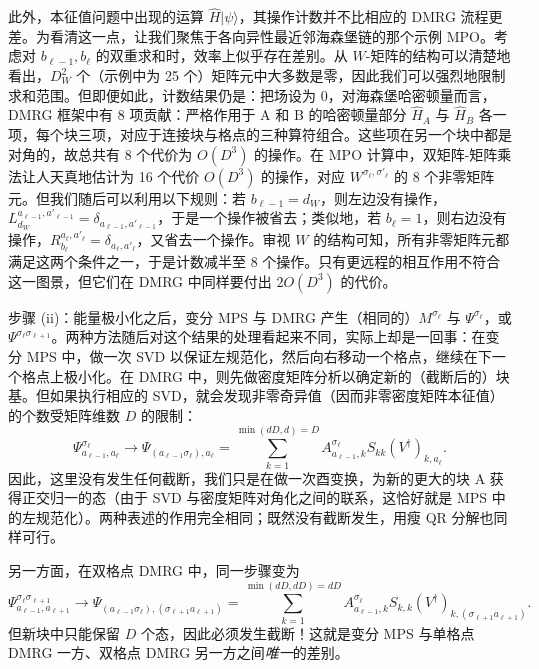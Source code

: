 \documentclass[a4paper,10pt,oneside,onecolumn,1p,times]{elsarticle}
\newcommand{\ket}[1]{\mbox{$| #1  \rangle$}}
\begin{document}
此外，本征值问题中出现的运算 $\hat{H}\ket{\psi}$，其操作计数并不比相应的 DMRG 流程更差。为看清这一点，让我们聚焦于各向异性最近邻海森堡链的那个示例 MPO。考虑对 $b_{\ell-1}, b_{\ell}$ 的双重求和时，效率上似乎存在差别。从 $W$-矩阵的结构可以清楚地看出，$D_W^2$ 个（示例中为 25 个）矩阵元中大多数是零，因此我们可以强烈地限制求和范围。但即便如此，计数结果仍是：把场设为 0，对海森堡哈密顿量而言，DMRG 框架中有 8 项贡献：严格作用于 A 和 B 的哈密顿量部分 $\hat{H}_A$ 与 $\hat{H}_B$ 各一项，每个块三项，对应于连接块与格点的三种算符组合。这些项在另一个块中都是对角的，故总共有 8 个代价为 $O(D^3)$ 的操作。在 MPO 计算中，双矩阵-矩阵乘法让人天真地估计为 16 个代价 $O(D^3)$ 的操作，对应 $W^{\sigma_{\ell},\sigma'_{\ell}}$ 的 8 个非零矩阵元。但我们随后可以利用以下规则：若 $b_{\ell-1}=d_W$，则左边没有操作，$L^{a_{\ell-1}, a'_{\ell-1}}_{d_W}= \delta_{a_{\ell-1}, a'_{\ell-1}}$，于是一个操作被省去；类似地，若 $b_{\ell}=1$，则右边没有操作，$R^{a_{\ell},a'_{\ell}}_{b_{\ell}}=\delta_{a_{\ell},a'_{\ell}}$，又省去一个操作。审视 $W$ 的结构可知，所有非零矩阵元都满足这两个条件之一，于是计数减半至 8 个操作。只有更远程的相互作用不符合这一图景，但它们在 DMRG 中同样要付出 $2O(D^3)$ 的代价。

步骤 (ii)：能量极小化之后，变分 MPS 与 DMRG 产生（相同的）$M^{\sigma_\ell}$ 与 $\Psi^{\sigma_\ell}$，或 $\Psi^{\sigma_\ell \sigma_{\ell+1}}$。两种方法随后对这个结果的处理看起来不同，实际上却是一回事：在变分 MPS 中，做一次 SVD 以保证左规范化，然后向右移动一个格点，继续在下一个格点上极小化。在 DMRG 中，则先做密度矩阵分析以确定新的（截断后的）块基。但如果执行相应的 SVD，就会发现非零奇异值（因而非零密度矩阵本征值）的个数受矩阵维数 $D$ 的限制：
\begin{equation}
\Psi^{\sigma_\ell}_{a_{\ell-1},a_ \ell} \rightarrow \Psi_{(a_{\ell-1} \sigma_ \ell), a_ \ell} = \sum_{k=1}^{\min(dD,d)=D} A^{\sigma_ \ell}_{a_{\ell-1},k} S_{kk} (V^\dagger)_{k, a_ \ell} .
\end{equation}
因此，这里没有发生任何截断，我们只是在做一次酉变换，为新的更大的块 A 获得正交归一的态（由于 SVD 与密度矩阵对角化之间的联系，这恰好就是 MPS 中的左规范化）。两种表述的作用完全相同；既然没有截断发生，用瘦 QR 分解也同样可行。

另一方面，在双格点 DMRG 中，同一步骤变为
\begin{equation}
\Psi^{\sigma_ \ell\sigma_{\ell +1}}_{a_{\ell-1},a_{\ell +1}} \rightarrow \Psi_{(a_{\ell-1} \sigma_ \ell), (\sigma_{\ell +1} a_{\ell +1})} = \sum_{k=1}^{\min(dD,dD)=dD} A^{\sigma_ \ell}_{a_{\ell-1},k} S_{k,k} (V^\dagger)_{k,(\sigma_{\ell +1} a_{\ell +1})} .
\end{equation}
但新块中只能保留 $D$ 个态，因此必须发生截断！这就是变分 MPS 与单格点 DMRG 一方、双格点 DMRG 另一方之间{\em 唯一}的差别。
\end{document}
